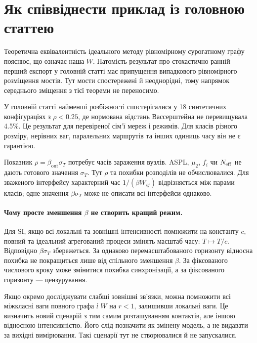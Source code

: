 \documentclass[11pt,a4paper]{article}
\begin{document}
\section{Як співвіднести приклад із головною статтею}
Теоретична еквівалентність ідеального методу рівномірному сурогатному графу пояснює, що означає наша $W$. Натомість результат про стохастично ранній перший експорт у головній статті має припущення випадкового рівномірного розміщення мостів. Тут мости спостережені й неоднорідні, тому напрямок середнього зміщення з тієї теореми не переносимо.

У головній статті найменші розбіжності спостерігалися у 18 синтетичних конфігураціях з $\rho<0.25$, де нормована відстань Вассерштейна не перевищувала 4.5\%. Це результат для перевіреної сім'ї мереж і режимів. Для класів різного розміру, нерівних ваг, паралельних маршрутів та інших одиниць часу він не є гарантією.

Показник $\rho=\beta_{\mathrm{out}}\sigma_T$ потребує часів зараження вузлів. ASPL, $\mu_2$, $f_i$ чи $N_{\rm eff}$ не дають готового значення $\sigma_T$. Тут $\rho$ та похибки розподілів не обчислювалися. Для зваженого інтерфейсу характерний час $1/(\beta W_{ij})$ відрізняється між парами класів; одне значення $\beta\sigma_T$ може не описати всі інтерфейси однаково.

\paragraph{Чому просте зменшення $\beta$ не створить кращий режим.}
Для SI, якщо всі локальні та зовнішні інтенсивності помножити на константу $c$, повний та ідеальний агрегований процеси змінять масштаб часу: $T\mapsto T/c$. Відповідно $\beta\sigma_T$ збережеться. За однаково перемасштабованого горизонту відносна похибка не покращиться лише від спільного зменшення $\beta$. За фіксованого числового кроку може змінитися похибка синхронізації, а за фіксованого горизонту --- цензурування.

Якщо окремо досліджувати слабші зовнішні зв'язки, можна помножити всі міжкласні ваги повного графа \emph{і} $W$ на $r<1$, залишивши локальні ваги. Це визначить новий сценарій з тим самим розташуванням контактів, але іншою відносною інтенсивністю. Його слід позначити як змінену модель, а не видавати за вихідні вимірювання. Такі сценарії тут не створювалися й не запускалися.
\end{document}
